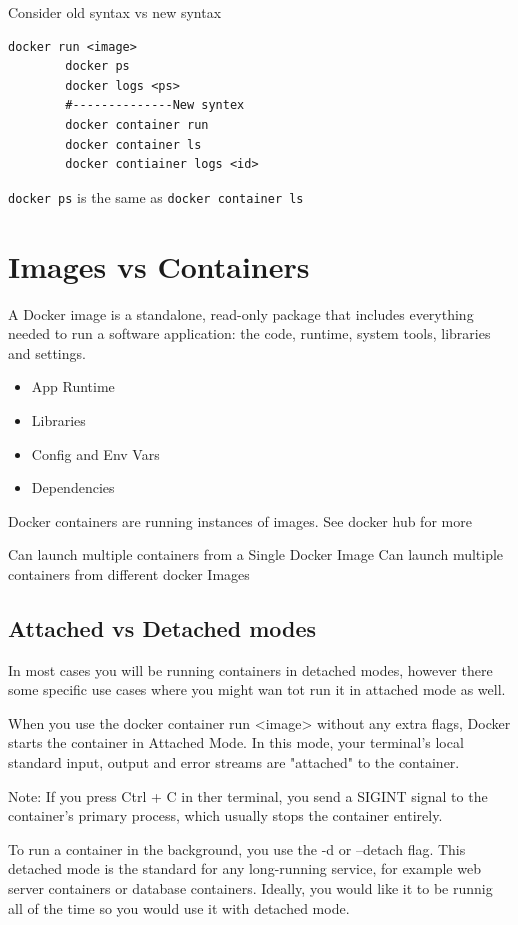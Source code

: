 \documentclass[11pt]{book}
\begin{document}
    Consider old syntax vs new syntax
    \begin{lstlisting}[style=terminal]
        docker run <image>
        docker ps
        docker logs <ps>
        #--------------New syntex
        docker container run
        docker container ls
        docker contiainer logs <id>
    \end{lstlisting}

    \texttt{docker ps} is the same as \texttt{docker container ls}


    \section{Images vs Containers}
    A Docker image is a standalone, read-only package that includes everything needed to run a software application: the code, runtime, system tools, libraries and settings.
    \begin{itemize}
        \item App Runtime
        \item Libraries
        \item Config and Env Vars
        \item Dependencies
    \end{itemize}

    Docker containers are running instances of images.
    See docker hub for more

    Can launch multiple containers from a Single Docker Image
    Can launch multiple containers from different docker Images

    \subsection{Attached vs Detached modes}
    In most cases you will be running containers in detached modes, however there some specific use cases where you might wan tot run it in attached mode as well.

    When you use the docker container run <image> without any extra flags, Docker starts the container in Attached Mode.
    In this mode, your terminal's local standard input, output and error streams are "attached" to the container.

    Note: If you press Ctrl + C in ther terminal, you send a SIGINT signal to the container's primary process, which usually stops the container entirely.

    To run a container in the background, you use the -d or --detach flag.
    This detached mode is the standard for any long-running service, for example web server containers or database containers.
    Ideally, you would like it to be runnig all of the time so you would use it with detached mode.
\end{document}
